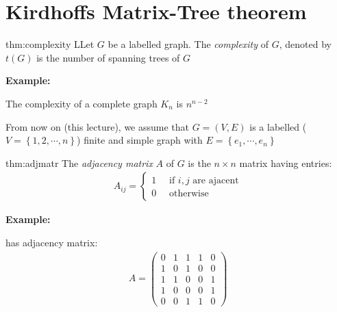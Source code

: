 \section{Kirdhoffs Matrix-Tree theorem}\par
\begin{theo}[Complexity]{thm:complexity}
  LLet $G$ be a labelled graph. The \textit{complexity} of $G$, denoted by $t(G)$ is the number of spanning trees of $G$
\end{theo}
\par\bigskip
\noindent\textbf{Example:}\par
\noindent The complexity of a complete graph $K_n$ is $n^{n-2}$
\par\bigskip
\noindent From now on (this lecture), we assume that $G = (V,E)$ is a labelled ($V = \left\{1,2,\cdots,n\right\}$) finite and simple graph with $E = \left\{e_1,\cdots, e_n\right\}$
\par\bigskip
\begin{theo}{thm:adjmatr}
  The \textit{adjacency matrix} $A$ of $G$ is the $n\times n$ matrix having entries:
  \begin{equation*}
    \begin{gathered}
      A_{ij} = \begin{cases}1\quad \text{ if $i,j$ are ajacent}\\0\quad\text{ otherwise}\end{cases}
    \end{gathered}
  \end{equation*}
\end{theo}
\par\bigskip
\noindent\textbf{Example:}\par
\noindent has adjacency matrix:
\begin{equation*}
  \begin{gathered}
    A = \begin{pmatrix}0&1&1&1&0\\1&0&1&0&0\\1&1&0&0&1\\1&0&0&0&1\\0&0&1&1&0\end{pmatrix}
  \end{gathered}
\end{equation*}

